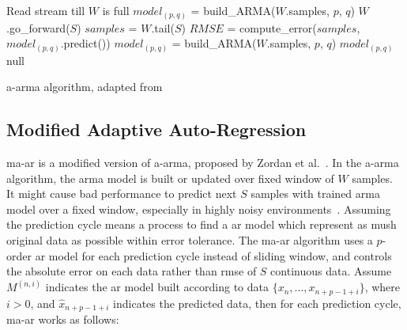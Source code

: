 \begin{algorithm}
\begin{algorithmic}[1]
\Input
\EndInput
\Output
\EndOutput

\State Read stream till $W$ is full 
\State $model_{(p, q)}$ = build\_ARMA($W$.samples, $p$, $q$)  
    \State $W$.go\_forward($S$) 
    \State $samples$ = $W$.tail($S$)
    \State $RMSE$ = compute\_error($samples$,  $model_{(p, q)}$.predict())
        \State $model_{(p, q)}$ = build\_ARMA($W$.samples, $p$, $q$)
        \State \Return $model_{(p, q)}$
    \Else
        \State \Return null 
    \EndIf
\EndWhile
\end{algorithmic}
\caption{\acrshort{a-arma} algorithm, adapted from~\cite{lu2010optimized}}
\label{algo:A-ARMA}
\end{algorithm}

\subsection{Modified Adaptive Auto-Regression}

\acrfull{ma-ar} is a modified version of \acrshort{a-arma}, proposed by Zordan
et al.~\cite{zordan2012compress}. In the \acrshort{a-arma} algorithm, the
\acrshort{arma} model is built or updated over fixed window of $W$ samples. It
might cause bad performance to predict next $S$ samples with trained
\acrshort{arma} model over a fixed window, especially in highly noisy
environments~\cite{zordan2012compress}. Assuming the prediction cycle means a
process to find a \acrshort{ar} model which represent as mush original data as
possible within error tolerance. The \acrshort{ma-ar} algorithm uses a $p$-order
\acrshort{ar} model for each prediction cycle instead of sliding window, and
controls the absolute error on each data rather than \acrshort{rmse} of $S$
continuous data. Assume $M^{(n, i)}$ indicates the \acrshort{ar} model built
according to data $\{x_n, ..., x_{n+p-1+i} \}$, where $i>0$, and
$\hat{x}_{n+p-1+i}$ indicates the predicted data, then for each prediction
cycle, \acrshort{ma-ar} works as follows:


